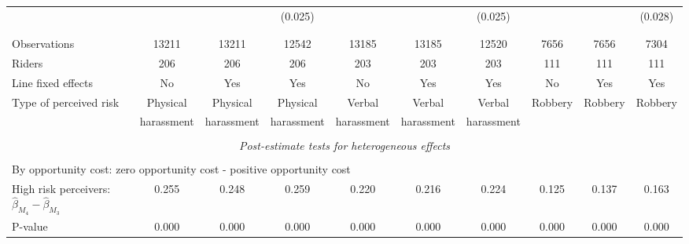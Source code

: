 \begin{tabular}{l*{9}{c}}
                    &                     &                     &     (0.025)         &                     &                     &     (0.025)         &                     &                     &     (0.028)         \\
\\[-1.8ex] \hline \\[-1.8ex]  
Observations        &       13211         &       13211         &       12542         &       13185         &       13185         &       12520         &        7656         &        7656         &        7304         \\
Riders              &         206         &         206         &         206         &         203         &         203         &         203         &         111         &         111         &         111         \\
Line fixed effects  &          No         &         Yes         &         Yes         &          No         &         Yes         &         Yes         &          No         &         Yes         &         Yes         \\
\multirow{2}{*}{Type of perceived risk}&    Physical         &    Physical         &    Physical         &      Verbal         &      Verbal         &      Verbal         &\multirow{2}{*}{Robbery}         &\multirow{2}{*}{Robbery}         &\multirow{2}{*}{Robbery}         \\
\,                  &  harassment         &  harassment         &  harassment         &  harassment         &  harassment         &  harassment         &                     &                     &                     \\
\hline \\[-1ex] \multicolumn{10}{c}{\textit{Post-estimate tests for heterogeneous effects}} \\\\[-1ex] \multicolumn{10}{l}{By opportunity cost: zero opportunity cost - positive opportunity cost} \\ \quad High risk perceivers: $\hat\beta_{M_4} - \hat\beta_{M_3}$&       0.255         &       0.248         &       0.259         &       0.220         &       0.216         &       0.224         &       0.125         &       0.137         &       0.163         \\
\quad P-value       &       0.000         &       0.000         &       0.000         &       0.000         &       0.000         &       0.000         &       0.000         &       0.000         &       0.000         \\

\end{tabular}
